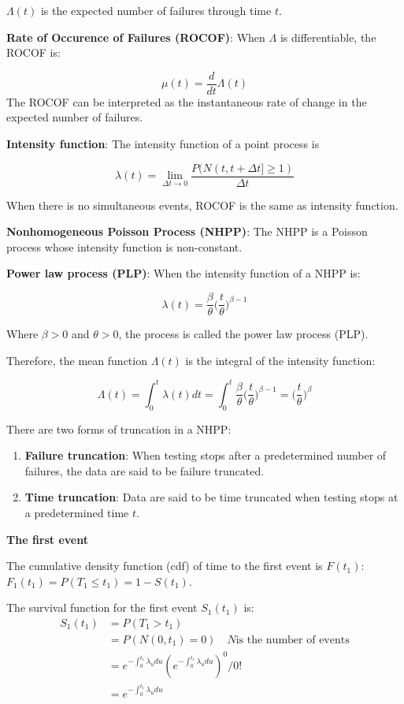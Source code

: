 \documentclass[12pt]{book}
\numberwithin{equation}{chapter}
\providecommand{\tightlist}{%
  \setlength{\itemsep}{0pt}\setlength{\parskip}{0pt}}
\begin{document}
\(\Lambda(t)\) is the expected number of failures through time \(t\).

\textbf{Rate of Occurence of Failures (ROCOF)}: When \(\Lambda\) is differentiable, the ROCOF is:

\[\mu(t) = \frac{d}{dt}\Lambda(t)\]
The ROCOF can be interpreted as the instantaneous rate of change in the expected number of failures.

\textbf{Intensity function}: The intensity function of a point process is

\[\lambda(t) = \lim_{\Delta t \rightarrow 0}\frac{P(N(t, t+\Delta t] \geq 1)}{\Delta t}\]

When there is no simultaneous events, ROCOF is the same as intensity function.

\textbf{Nonhomogeneous Poisson Process (NHPP)}: The NHPP is a Poisson process whose intensity function is non-constant.

\textbf{Power law process (PLP)}: When the intensity function of a NHPP is:

\[\lambda(t) = \frac{\beta}{\theta}\bigg(\frac{t}{\theta}\bigg)^{\beta-1}\]

Where \(\beta > 0\) and \(\theta > 0\), the process is called the power law process (PLP).

Therefore, the mean function \(\Lambda(t)\) is the integral of the intensity function:

\[\Lambda(t) = \int_0^t \lambda(t)dt = \int_0^t \frac{\beta}{\theta}\bigg(\frac{t}{\theta}\bigg)^{\beta-1} = \bigg(\frac{t}{\theta}\bigg)^{\beta}\]

There are two forms of truncation in a NHPP:

\begin{enumerate}
\def\labelenumi{\arabic{enumi}.}
\tightlist
\item
  \textbf{Failure truncation}: When testing stops after a predetermined number of failures, the data are said to be failure truncated.
\item
  \textbf{Time truncation}: Data are said to be time truncated when testing stops at a predetermined time \(t\).
\end{enumerate}

\textbf{The first event}

The cumulative density function (cdf) of time to the first event is \(F(t_1)\): \(F_1(t_1) = P(T_1 \leq t_1) = 1 - S(t_1)\).

The survival function for the first event \(S_1(t_1)\) is:
\begin{align*}
S_1(t_1) & = P(T_1 > t_1) \\
 & = P(N(0, t_1) = 0) \quad N \text{is the number of events}\\
 & = e^{-\int_{0}^{t_1}\lambda_{u}du}(e^{-\int_{0}^{t_1}\lambda_{u}du})^0/0!\\
 & = e^{-\int_{0}^{t_1}\lambda_{u}du}
\end{align*}
\end{document}
